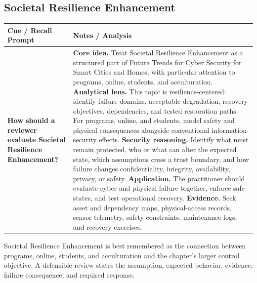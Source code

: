 \documentclass[11pt]{article}
\newcommand{\CornellHeader}{%
\rowcolor{Navy}\color{white}\bfseries Cue / Recall Prompt & \color{white}\bfseries Notes / Analysis\\\hline}
\newcommand{\CornellRow}[2]{%
\cellcolor{CueGray}\RaggedRight\textbf{#1} & \RaggedRight #2\\\hline}
\begin{document}
\subsection*{Societal Resilience Enhancement}
\begin{longtable}{>{\RaggedRight\arraybackslash}p{}|>{\RaggedRight\arraybackslash}p{}}
\CornellHeader
\CornellRow{How should a reviewer evaluate Societal Resilience Enhancement?}{\textbf{Core idea.} Treat Societal Resilience Enhancement as a structured part of Future Trends for Cyber Security for Smart Cities and Homes, with particular attention to programs, online, students, and acculturation. \textbf{Analytical lens.} This topic is resilience-centered: identify failure domains, acceptable degradation, recovery objectives, dependencies, and tested restoration paths. For programs, online, and students, model safety and physical consequences alongside conventional information-security effects. \textbf{Security reasoning.} Identify what must remain protected, who or what can alter the expected state, which assumptions cross a trust boundary, and how failure changes confidentiality, integrity, availability, privacy, or safety. \textbf{Application.} The practitioner should evaluate cyber and physical failure together, enforce safe states, and test operational recovery. \textbf{Evidence.} Seek asset and dependency maps, physical-access records, sensor telemetry, safety constraints, maintenance logs, and recovery exercises.}
\end{longtable}
\begin{topicsummary}
Societal Resilience Enhancement is best remembered as the connection between programs, online, students, and acculturation and the chapter's larger control objective. A defensible review states the assumption, expected behavior, evidence, failure consequence, and required response.
\end{topicsummary}
\end{document}
